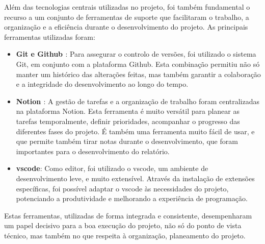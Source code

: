 Além das tecnologias centrais utilizadas no projeto, foi também fundamental o recurso a um conjunto de ferramentas de suporte que facilitaram o trabalho, a organização e a eficiência durante o desenvolvimento do projeto. As principais ferramentas utilizadas foram:

\begin{itemize}
    \item \textbf{Git \cite{git} e Github \cite{github}}: Para assegurar o controlo de versões, foi utilizado o sistema Git, em conjunto com a plataforma Github. Esta combinação permitiu não só manter um histórico  das alterações feitas, mas também garantir a colaboração e a integridade do desenvolvimento ao longo do tempo.

    \item \textbf{Notion \cite{notion}}: A gestão de tarefas e a organização de trabalho foram centralizadas na plataforma Notion. Esta ferramenta é muito versátil para planear as tarefas temporalmente, definir prioridades, acompanhar o progresso das diferentes fases do projeto. É também uma ferramenta muito fácil de usar, e que permite também tirar notas durante o desenvolvimento, que foram importantes para o desenvolvimento do relatório.

    \item \textbf{\gls{vscode}\cite{vscode}}: Como editor, foi utilizado o \gls{vscode}, um ambiente de desenvolvimento  leve, e muito extensível. Através da instalação de extensões específicas, foi possível adaptar o \gls{vscode} às necessidades do projeto, potenciando a produtividade e melhorando a experiência de programação.
\end{itemize}

Estas ferramentas, utilizadas de forma integrada e consistente, desempenharam um papel decisivo para a boa execução do projeto, não só do ponto de vista técnico, mas também no que respeita à organização, planeamento do projeto.
